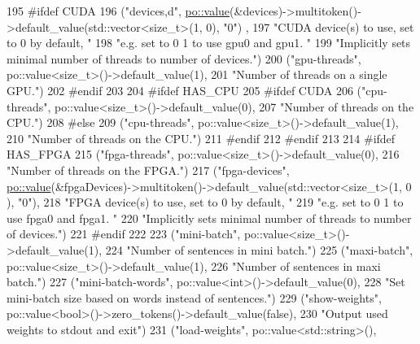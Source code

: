 \begin{DoxyCode}
195 #ifdef CUDA
196     (\textcolor{stringliteral}{"devices,d"}, \hyperlink{namespacemarian_1_1keywords_ac70de1b4c3cf6b7080cf5086f2963fd8}{po::value}(&devices)->multitoken()->default\_value(std::vector<size\_t>(1, 0), \textcolor{stringliteral}{"0"})
      ,
197      \textcolor{stringliteral}{"CUDA device(s) to use, set to 0 by default, "}
198      \textcolor{stringliteral}{"e.g. set to 0 1 to use gpu0 and gpu1. "}
199      \textcolor{stringliteral}{"Implicitly sets minimal number of threads to number of devices."})
200     (\textcolor{stringliteral}{"gpu-threads"}, po::value<size\_t>()->default\_value(1),
201      \textcolor{stringliteral}{"Number of threads on a single GPU."})
202 #endif
203 
204 #ifdef HAS\_CPU
205   #ifdef CUDA
206     (\textcolor{stringliteral}{"cpu-threads"}, po::value<size\_t>()->default\_value(0),
207      \textcolor{stringliteral}{"Number of threads on the CPU."})
208   #\textcolor{keywordflow}{else}
209      (\textcolor{stringliteral}{"cpu-threads"}, po::value<size\_t>()->default\_value(1),
210       \textcolor{stringliteral}{"Number of threads on the CPU."})
211   #endif
212 #endif
213 
214 #ifdef HAS\_FPGA
215     (\textcolor{stringliteral}{"fpga-threads"}, po::value<size\_t>()->default\_value(0),
216      \textcolor{stringliteral}{"Number of threads on the FPGA."})
217     (\textcolor{stringliteral}{"fpga-devices"}, \hyperlink{namespacemarian_1_1keywords_ac70de1b4c3cf6b7080cf5086f2963fd8}{po::value}(&fpgaDevices)->multitoken()->default\_value(std::vector<size\_t>(1, 0
      ), \textcolor{stringliteral}{"0"}),
218      \textcolor{stringliteral}{"FPGA device(s) to use, set to 0 by default, "}
219         \textcolor{stringliteral}{"e.g. set to 0 1 to use fpga0 and fpga1. "}
220         \textcolor{stringliteral}{"Implicitly sets minimal number of threads to number of devices."})
221 #endif
222 
223     (\textcolor{stringliteral}{"mini-batch"}, po::value<size\_t>()->default\_value(1),
224      \textcolor{stringliteral}{"Number of sentences in mini batch."})
225     (\textcolor{stringliteral}{"maxi-batch"}, po::value<size\_t>()->default\_value(1),
226       \textcolor{stringliteral}{"Number of sentences in maxi batch."})
227     (\textcolor{stringliteral}{"mini-batch-words"}, po::value<int>()->default\_value(0),
228       \textcolor{stringliteral}{"Set mini-batch size based on words instead of sentences."})
229     (\textcolor{stringliteral}{"show-weights"}, po::value<bool>()->zero\_tokens()->default\_value(\textcolor{keyword}{false}),
230      \textcolor{stringliteral}{"Output used weights to stdout and exit"})
231     (\textcolor{stringliteral}{"load-weights"}, po::value<std::string>(),

\end{DoxyCode}
